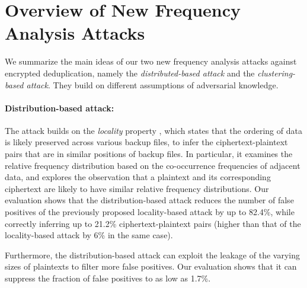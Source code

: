 \documentclass[bachelor]{thesis-uestc}
\begin{document}
\section{Overview of New Frequency Analysis Attacks}

We summarize the main ideas of our two new frequency analysis attacks against
encrypted deduplication, namely the {\em distributed-based attack} and the
{\em clustering-based attack}. They build on different assumptions of
adversarial knowledge.

\paragraph{Distribution-based attack:}  The attack builds on the 
{\em locality} property \cite{xia11,lillibridge09,zhu08}, which states that
the ordering of data is likely preserved across various backup files, to infer
the ciphertext-plaintext pairs that are in similar positions of backup files.
In particular, it examines the relative frequency distribution based on the
co-occurrence frequencies of adjacent data, and explores the observation that a
plaintext and its corresponding ciphertext are likely to have similar relative
frequency distributions. Our evaluation shows that the distribution-based
attack reduces the number of false positives of the previously proposed
locality-based attack \cite{li17} by up to 82.4\%, while correctly inferring
up to 21.2\% ciphertext-plaintext pairs (higher than that of the
locality-based attack \cite{li17} by 6\% in the same case).  

Furthermore, the distribution-based attack can exploit the leakage of the
varying sizes of plaintexts to filter more false positives.  Our evaluation
shows that it can suppress the fraction of false positives to as low as 1.7\%. 


\end{document}
